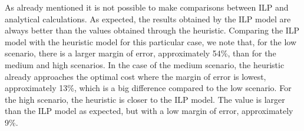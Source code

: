 \vspace{13pt}
As already mentioned it is not possible to make comparisons between ILP and analytical calculations. As expected, the results obtained by the ILP model are always better than the values obtained through the heuristic. Comparing the ILP model with the heuristic model for this particular case, we note that, for the low scenario, there is a larger margin of error, approximately 54\%, than for the medium and high scenarios.
In the case of the medium scenario, the heuristic already approaches the optimal cost where the margin of error is lowest, approximately 13\%, which is a big difference compared to the low scenario.
For the high scenario, the heuristic is closer to the ILP model. The value is larger than the ILP model as expected, but with a low margin of error, approximately 9\%.\\
